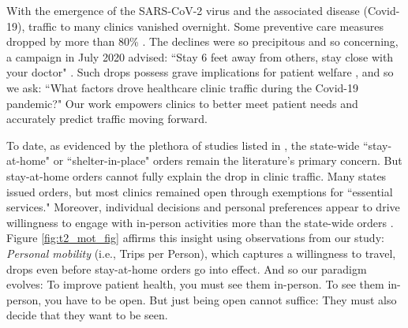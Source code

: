  With the emergence of the SARS-CoV-2 virus and the associated disease (Covid-19), traffic to many clinics vanished overnight. Some preventive care measures dropped by more than 80\% \citep{Cantor2020}. The declines were so precipitous and so concerning, a campaign in July 2020 advised: “Stay 6 feet away from others, stay close with your doctor" \citep{StopMedicalDistancing.org}. Such drops possess grave implications for patient welfare \citep{WSJ_skipDoc}, and so we ask: “What factors drove healthcare clinic traffic during the Covid-19 pandemic?" Our work empowers clinics to better meet patient needs \citep[as in][]{Musalem2020} and accurately predict traffic moving forward. 

 To date, as evidenced by the plethora of studies listed in \cite{Gupta2020}, the state-wide “stay-at-home" or “shelter-in-place" orders remain the literature's primary concern. But stay-at-home orders cannot fully explain the drop in clinic traffic. Many states issued orders, but most clinics remained open through exemptions for “essential services." Moreover, individual decisions and personal preferences appear to drive willingness to engage with in-person activities more than the state-wide orders \citep{Goolsbee2020_key}. Figure \ref{fig:t2_mot_fig} affirms this insight using observations from our study: \textit{Personal mobility} (i.e., Trips per Person), which captures a willingness to travel, drops even before stay-at-home orders go into effect. And so our paradigm evolves: To improve patient health, you must see them in-person. To see them in-person, you have to be open. But just being open cannot suffice: They must also decide that they want to be seen.
 
